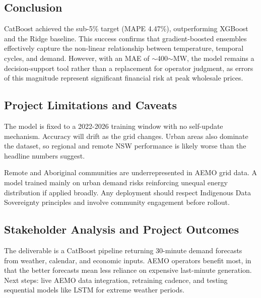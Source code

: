 \documentclass[11pt, a4paper, nofootinbib]{article}
\begin{document}
\subsection{Conclusion}
CatBoost achieved the sub-5\% target (MAPE 4.47\%), outperforming XGBoost and the Ridge baseline. This success confirms that gradient-boosted ensembles effectively capture the non-linear relationship between temperature, temporal cycles, and demand. However, with an MAE of $\sim$400$\sim$MW, the model remains a decision-support tool rather than a replacement for operator judgment, as errors of this magnitude represent significant financial risk at peak wholesale prices.

\subsection{Project Limitations and Caveats}
The model is fixed to a 2022-2026 training window with no self-update mechanism. Accuracy will drift as the grid changes. Urban areas also dominate the dataset, so regional and remote NSW performance is likely worse than the headline numbers suggest.

Remote and Aboriginal communities are underrepresented in AEMO grid data. A model trained mainly on urban demand risks reinforcing unequal energy distribution if applied broadly. Any deployment should respect Indigenous Data Sovereignty principles and involve community engagement before rollout.

\subsection{Stakeholder Analysis and Project Outcomes}
The deliverable is a CatBoost pipeline returning 30-minute demand forecasts from weather, calendar, and economic inputs. AEMO operators benefit most, in that the better forecasts mean less reliance on expensive last-minute generation. Next steps: live AEMO data integration, retraining cadence, and testing sequential models like LSTM for extreme weather periods.
\end{document}
